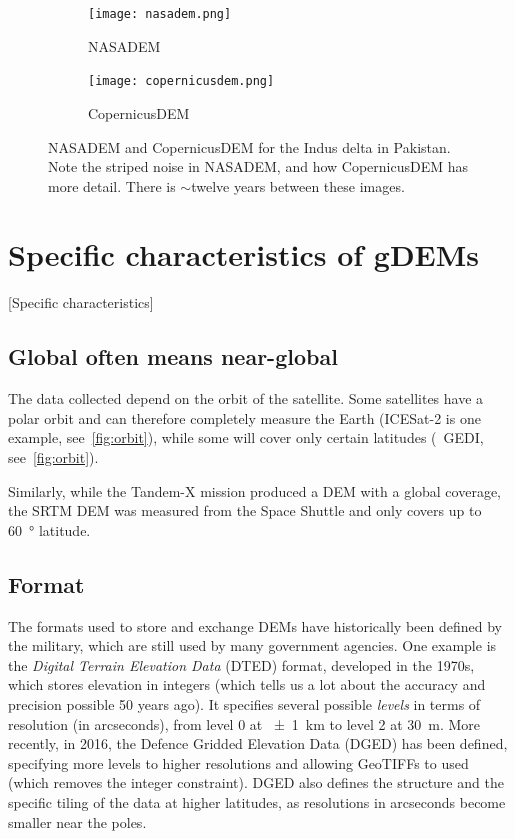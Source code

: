 \begin{figure}
  \centering
  \begin{subfigure}[t]
    {0.45\linewidth}
    \texttt{[image: nasadem.png]}
    \caption{NASADEM}\label{fig:nasadem}
  \end{subfigure}
  \qquad
  \begin{subfigure}[t]
    {0.45\linewidth}
    \texttt{[image: copernicusdem.png]}
    \caption{CopernicusDEM}\label{fig:copernicusdem}
  \end{subfigure}
  \caption{NASADEM and CopernicusDEM for the Indus delta in Pakistan. Note the striped noise in NASADEM, and how CopernicusDEM has more detail. There is $\sim$twelve years between these images.}%
  \label{fig:dem_comparison}
\end{figure}





%
\section{Specific characteristics of gDEMs}[Specific characteristics]

\subsection{Global often means near-global}

The data collected depend on the orbit of the satellite.
Some satellites have a polar orbit and can therefore completely measure the Earth (ICESat-2 is one example, see~\ref{fig:orbit}), while some will cover only certain latitudes (\eg\ GEDI, see~\ref{fig:orbit}).

Similarly, while the Tandem-X mission produced a DEM with a global coverage, the SRTM DEM was measured from the Space Shuttle and only covers up to \qty{60}{\degree} latitude.

\subsection{Format}

The formats used to store and exchange DEMs have historically been defined by the military, which are still used by many government agencies.
One example is the \emph{Digital Terrain Elevation Data} (DTED) format, developed in the 1970s, which stores elevation in integers (which tells us a lot about the accuracy and precision possible 50 years ago).
It specifies several possible \emph{levels} in terms of resolution (in arcseconds), from level 0 at \qty{\pm1}{km} to level 2 at \qty{30}{m}.
More recently, in 2016, the Defence Gridded Elevation Data (DGED) has been defined, specifying more levels to higher resolutions and allowing GeoTIFFs to used (which removes the integer constraint).
DGED also defines the structure and the specific tiling of the data at higher latitudes, as resolutions in arcseconds become smaller near the poles.

